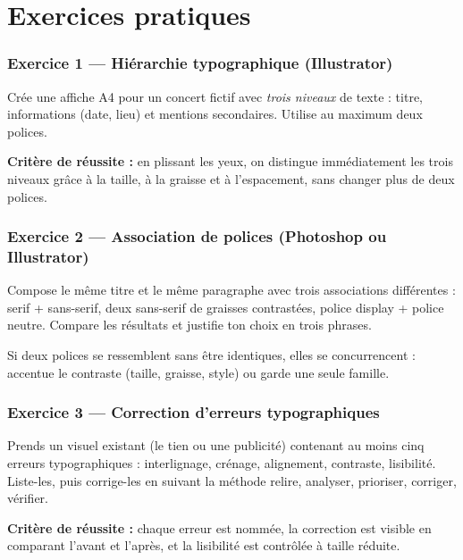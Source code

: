 \section*{Exercices pratiques}

\subsubsection*{Exercice 1 --- Hiérarchie typographique (Illustrator)}

Crée une affiche A4 pour un concert fictif avec \emph{trois niveaux} de texte : titre, informations (date, lieu) et mentions secondaires. Utilise au maximum deux polices.

\begin{retenir}
\textbf{Critère de réussite :} en plissant les yeux, on distingue immédiatement les trois niveaux grâce à la taille, à la graisse et à l'espacement, sans changer plus de deux polices.
\end{retenir}

\subsubsection*{Exercice 2 --- Association de polices (Photoshop ou Illustrator)}

Compose le même titre et le même paragraphe avec trois associations différentes : serif + sans-serif, deux sans-serif de graisses contrastées, police display + police neutre. Compare les résultats et justifie ton choix en trois phrases.

\begin{astuce}
Si deux polices se ressemblent sans être identiques, elles se concurrencent : accentue le contraste (taille, graisse, style) ou garde une seule famille.
\end{astuce}

\subsubsection*{Exercice 3 --- Correction d'erreurs typographiques}

Prends un visuel existant (le tien ou une publicité) contenant au moins cinq erreurs typographiques : interlignage, crénage, alignement, contraste, lisibilité. Liste-les, puis corrige-les en suivant la méthode relire, analyser, prioriser, corriger, vérifier.

\begin{retenir}
\textbf{Critère de réussite :} chaque erreur est nommée, la correction est visible en comparant l'avant et l'après, et la lisibilité est contrôlée à taille réduite.
\end{retenir}

